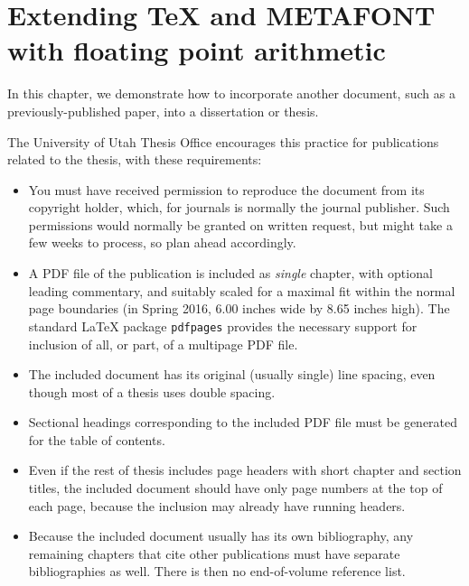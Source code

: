 
\chapter{Extending \TeX{} and METAFONT with floating point arithmetic}

In this chapter, we demonstrate how to incorporate another
document, such as a previously-published paper, into a
dissertation or thesis.

The University of Utah Thesis Office encourages this
practice for publications related to the thesis, with
these requirements:

\begin{itemize}

  \item
        You must have received permission to reproduce the
        document from its copyright holder, which, for
        journals is normally the journal publisher.  Such
        permissions would normally be granted on written
        request, but might take a few weeks to process, so
        plan ahead accordingly.

  \item
        A PDF file of the publication is included as
        \emph{single} chapter, with optional leading
        commentary, and suitably scaled for a maximal fit
        within the normal page boundaries (in Spring 2016,
        6.00 inches wide by 8.65 inches high).  The standard
        \LaTeX{} package \verb=pdfpages= provides the
        necessary support for inclusion of all, or part, of
        a multipage PDF file.

  \item
        The included document has its original (usually
        single) line spacing, even though most of a thesis
        uses double spacing.

  \item
        Sectional headings corresponding to the included
        PDF file must be generated for the table of
        contents.

  \item
        Even if the rest of thesis includes page headers
        with short chapter and section titles, the
        included document should have only page numbers
        at the top of each page, because the inclusion
        may already have running headers.

  \item
        Because the included document usually has its
        own bibliography, any remaining chapters that cite
        other publications must have separate bibliographies
        as well.  There is then no end-of-volume reference
        list.

\end{itemize}


